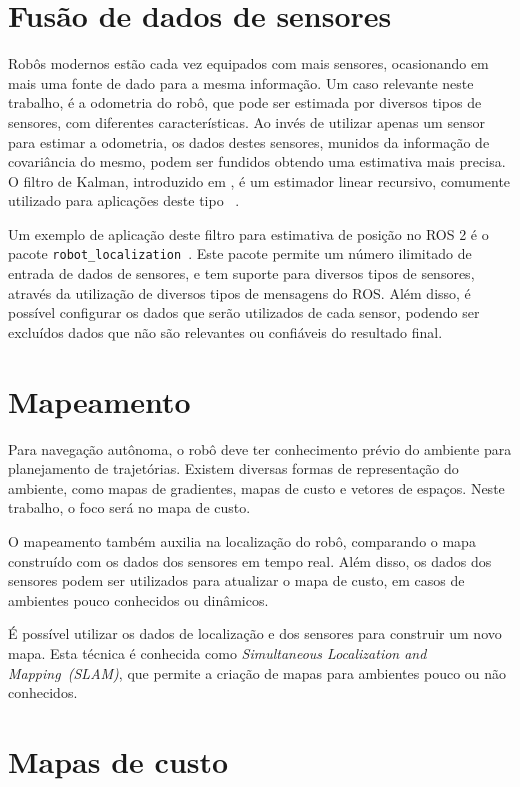 \documentclass[repeatfields,xlists,xpacks,oneside,yearsonly]{ufrgscca}
\begin{document}
\section{Fusão de dados de sensores}

Robôs modernos estão cada vez equipados com mais sensores,
ocasionando em mais uma fonte de dado para a mesma informação. Um
caso relevante neste trabalho, é a odometria do robô, que pode ser
estimada por diversos tipos de sensores, com diferentes
características. Ao invés de utilizar apenas um sensor para estimar a
odometria, os dados destes sensores, munidos da informação de
covariância do mesmo, podem ser fundidos obtendo uma estimativa mais
precisa. O filtro de Kalman, introduzido em \textcite{KalmanFilter},
é um estimador linear recursivo, comumente utilizado para aplicações
deste tipo ~\cite{KalmanFilterMultisensor}. 

Um exemplo de aplicação deste filtro para estimativa de posição no
ROS 2 é o pacote
\texttt{robot\_localization}~\cite{robot_localization_paper}. Este
pacote permite um número ilimitado de entrada de dados de sensores, e
tem suporte para diversos tipos de sensores, através da utilização de
diversos tipos de mensagens do ROS. Além disso, é possível configurar
os dados que serão utilizados de cada sensor, podendo ser excluídos
dados que não são relevantes ou confiáveis do resultado final.

\section{Mapeamento}

Para navegação autônoma, o robô deve ter conhecimento prévio do
ambiente para planejamento de trajetórias. Existem diversas formas de
representação do ambiente, como mapas de gradientes, mapas de custo e
vetores de espaços. Neste trabalho, o foco será no mapa de custo.

O mapeamento também auxilia na localização do robô, comparando o mapa
construído com os dados dos sensores em tempo real. Além disso, os
dados dos sensores podem ser utilizados para atualizar o mapa de
custo, em casos de ambientes pouco conhecidos ou dinâmicos.

É possível utilizar os dados de localização e dos sensores para construir um novo mapa.
Esta técnica é conhecida como \textit{Simultaneous Localization and Mapping~(SLAM)},
que permite a criação de mapas para ambientes pouco ou não conhecidos.

\section{Mapas de custo}
\end{document}
